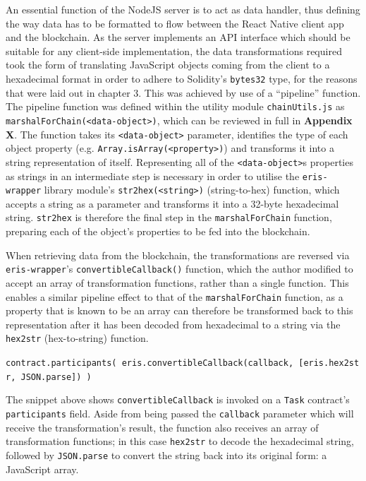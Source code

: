 An essential function of the NodeJS server is to act as data handler,
thus defining the way data has to be formatted to flow between the React
Native client app and the blockchain. As the server implements an API
interface which should be suitable for any client-side implementation,
the data transformations required took the form of translating
JavaScript objects coming from the client to a hexadecimal format in
order to adhere to Solidity's \texttt{bytes32} type, for the reasons
that were laid out in chapter 3. This was achieved by use of a
``pipeline'' function.\\
The pipeline function was defined within the utility module
\texttt{chainUtils.js} as
\texttt{marshalForChain(\textless{}data-object\textgreater{})}, which
can be reviewed in full in \textbf{Appendix X}. The function takes its
\texttt{\textless{}data-object\textgreater{}} parameter, identifies the
type of each object property (e.g.
\texttt{Array.isArray(\textless{}property\textgreater{})}) and
transforms it into a string representation of itself. Representing all
of the \texttt{\textless{}data-object\textgreater{}}s properties as
strings in an intermediate step is necessary in order to utilise the
\texttt{eris-wrapper} library module's
\texttt{str2hex(\textless{}string\textgreater{})} (string-to-hex)
function, which accepts a string as a parameter and transforms it into a
32-byte hexadecimal string. \texttt{str2hex} is therefore the final step
in the \texttt{marshalForChain} function, preparing each of the object's
properties to be fed into the blockchain.

When retrieving data from the blockchain, the transformations are
reversed via \texttt{eris-wrapper}'s \texttt{convertibleCallback()}
function, which the author modified to accept an array of transformation
functions, rather than a single function. This enables a similar
pipeline effect to that of the \texttt{marshalForChain} function, as a
property that is known to be an array can therefore be transformed back
to this representation after it has been decoded from hexadecimal to a
string via the \texttt{hex2str} (hex-to-string) function.

\texttt{contract.participants(\ eris.convertibleCallback(callback,\ {[}eris.hex2str,\ JSON.parse{]})\ )}

The snippet above shows \texttt{convertibleCallback} is invoked on a
\texttt{Task} contract's \texttt{participants} field. Aside from being
passed the \texttt{callback} parameter which will receive the
transformation's result, the function also receives an array of
transformation functions; in this case \texttt{hex2str} to decode the
hexadecimal string, followed by \texttt{JSON.parse} to convert the
string back into its original form: a JavaScript array.

